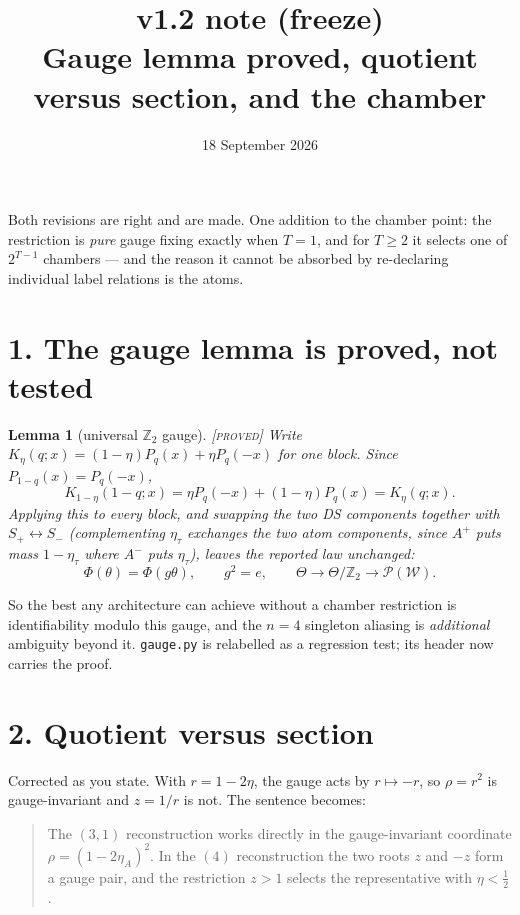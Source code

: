 \documentclass[11pt]{article}
\title{\textbf{v1.2 note (freeze)}\\[2pt]
\large Gauge lemma proved, quotient versus section, and the chamber}
\author{18 September 2026}
\date{}
\newtheorem{lemma}{Lemma}
\theoremstyle{remark}
\newcommand{\status}[1]{\hfill{\normalfont\small\textsc{[#1]}}}
\newcommand{\Z}{\mathbb{Z}_2}
\begin{document}
\maketitle
\vspace{-2.5em}

Both revisions are right and are made. One addition to the chamber point: the restriction is \emph{pure} gauge fixing exactly when $T=1$, and for $T\ge2$ it selects one of $2^{T-1}$ chambers --- and the reason it cannot be absorbed by re-declaring individual label relations is the atoms.

\section*{1. The gauge lemma is proved, not tested}

\begin{lemma}[universal $\Z$ gauge]\status{proved}
Write $K_\eta(q;x)=(1-\eta)P_q(x)+\eta P_q(-x)$ for one block. Since $P_{1-q}(x)=P_q(-x)$,
\[
K_{1-\eta}(1-q;x)=\eta P_q(-x)+(1-\eta)P_q(x)=K_\eta(q;x).
\]
Applying this to every block, and swapping the two DS components together with $S_+\leftrightarrow S_-$ (complementing $\eta_\tau$ exchanges the two atom components, since $A^+$ puts mass $1-\eta_\tau$ where $A^-$ puts $\eta_\tau$), leaves the reported law unchanged:
\[
\Phi(\theta)=\Phi(g\theta),\qquad g^2=e,\qquad
\Theta\to\Theta/\Z\to\mathcal P(\mathcal W).
\]
\end{lemma}

So the best any architecture can achieve without a chamber restriction is identifiability modulo this gauge, and the $n=4$ singleton aliasing is \emph{additional} ambiguity beyond it. \texttt{gauge.py} is relabelled as a regression test; its header now carries the proof.

\section*{2. Quotient versus section}

Corrected as you state. With $r=1-2\eta$, the gauge acts by $r\mapsto-r$, so $\rho=r^2$ is gauge-invariant and $z=1/r$ is not. The sentence becomes:

\begin{quote}
The $(3,1)$ reconstruction works directly in the gauge-invariant coordinate $\rho=(1-2\eta_A)^2$. In the $(4)$ reconstruction the two roots $z$ and $-z$ form a gauge pair, and the restriction $z>1$ selects the representative with $\eta<\tfrac12$.
\end{quote}
\end{document}
